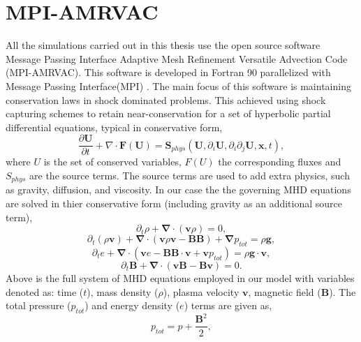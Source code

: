 \documentclass[12pt]{ociamthesis}
\newcommand{\bs}[1]{\boldsymbol{#1}}
\newcommand{\bn}{\boldsymbol{\nabla}}
\begin{document}
\section{MPI-AMRVAC}
All the simulations carried out in this thesis use the open source software Message Passing Interface Adaptive Mesh Refinement Versatile Advection Code (MPI-AMRVAC). This software is developed in Fortran 90 parallelized with Message Passing Interface(MPI) \citep{toth1996ApLC34245T,Keppens_2012,Porth_2014,Xia_2017}. The main focus of this software is maintaining conservation laws in shock dominated problems. This achieved using shock capturing schemes to retain near-conservation for a set of hyperbolic partial differential equations, typical in conservative form,
\begin{equation}\label{AMRVAC_stlye}
\frac{\partial \boldsymbol{U}}{\partial t} + \nabla \cdot \boldsymbol{F}(\boldsymbol{U}) = \boldsymbol{S}_{phys} (\boldsymbol{U}, \partial_{i} \boldsymbol{U}, \partial_i \partial_j \boldsymbol{U},\boldsymbol{x},t) ,
\end{equation}
where $U$ is the set of conserved variables, $F(U)$ the corresponding fluxes and $S_{phys}$ are the source terms. The source terms are used to add extra physics, such as gravity, diffusion, and viscosity. In our case the the governing MHD equations are solved in thier conservative form (including gravity as an additional source term),
\begin{equation} \label{eq1}
\partial_t \rho + \bn \cdot (\bs{v} \rho) = 0,
\end{equation}   
\begin{equation}\label{eq2}
\partial_t (\rho \bs{v})  + \bn \cdot ( \bs{v} \rho \bs{v} - \bs{BB}) + \bn p_{tot} = \rho \bs{g},
\end{equation}
\begin{equation}\label{eq3}
\partial_t e + \bn \cdot (\bs{v} e - \bs{BB}\cdot\bs{v}+\bs{v}p_{tot}) = \rho \bs{g} \cdot \bs{v},
\end{equation}
\begin{equation}\label{eq4}
\partial_t \bs{B} + \bn \cdot (\bs{vB}-\bs{Bv} ) = 0.
\end{equation}
Above is the full system of MHD equations employed in our model with variables denoted as: time ($t$), mass density ($\rho$), plasma velocity $\bs{v}$, magnetic field ($\bs{B}$). The total pressure ($p_{tot}$) and energy density ($e$) terms are given as,
\begin{equation}
p_{tot} = p+\frac{\bs{B}^2}{2},
\end{equation}
\end{document}

